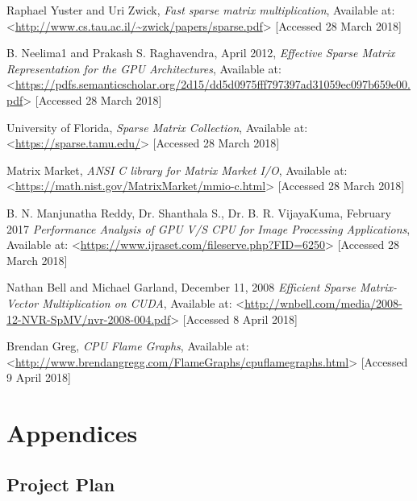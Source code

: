 \documentclass[12pt]{article}
\begin{document}
\newpage
\begin{thebibliography}{0}

Raphael Yuster and Uri Zwick, \textit{Fast sparse matrix multiplication}, Available at: <\url{http://www.cs.tau.ac.il/~zwick/papers/sparse.pdf}> [Accessed 28 March 2018]

B. Neelima1 and Prakash S. Raghavendra, April 2012,  \textit{Effective Sparse Matrix Representation for the
GPU Architectures}, Available at: <\url{https://pdfs.semanticscholar.org/2d15/dd5d0975fff797397ad31059ec097b659e00.pdf}> [Accessed 28 March 2018]

University of Florida, \textit{Sparse Matrix Collection}, Available at: <\url{https://sparse.tamu.edu/}> [Accessed 28 March 2018]

Matrix Market, \textit{ANSI C library for Matrix Market I/O}, Available at: <\url{https://math.nist.gov/MatrixMarket/mmio-c.html}> [Accessed 28 March 2018]

B. N. Manjunatha Reddy, Dr. Shanthala S., Dr. B. R. VijayaKuma, February 2017 \textit{Performance Analysis of GPU V/S CPU for Image
Processing Applications}, Available at: <\url{https://www.ijraset.com/fileserve.php?FID=6250}> [Accessed 28 March 2018]


Nathan Bell and Michael Garland, December 11, 2008 \textit{Efficient Sparse Matrix-Vector Multiplication on CUDA}, Available at: <\url{http://wnbell.com/media/2008-12-NVR-SpMV/nvr-2008-004.pdf}> [Accessed 8 April 2018]

Brendan Greg, \textit{CPU Flame Graphs}, Available at: <\url{http://www.brendangregg.com/FlameGraphs/cpuflamegraphs.html}> [Accessed 9 April 2018]

\end{thebibliography}
\newpage

\section*{Appendices}

\subsection*{Project Plan}
\end{document}
